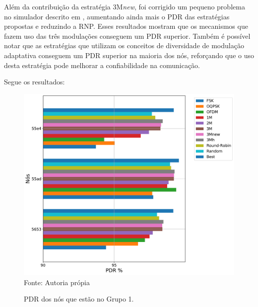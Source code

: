 Além da contribuição da estratégia 3M\textit{new}, foi corrigido um pequeno problema no simulador descrito em \cite{gomes2020improving}, aumentando ainda mais o PDR das estratégias propostas e reduzindo a RNP. 
Esses resultados mostram que os mecanismos que fazem uso das três modulações conseguem um PDR superior. Também é possível notar que as estratégias que utilizam os conceitos de diversidade de modulação adaptativa conseguem um PDR superior na maioria dos nós, reforçando que o uso desta estratégia pode melhorar a confiabilidade na comunicação. 
 

Segue os resultados: 

\begin{figure}[H]
    \centering
    \caption{\footnotesize PDR dos nós que estão no Grupo 1.}
    \includegraphics[scale = 0.6]{sections/textual/Imagens/grupo1.pdf}\\
    Fonte: Autoria própia
    \label{fig:g1}
\end{figure}

